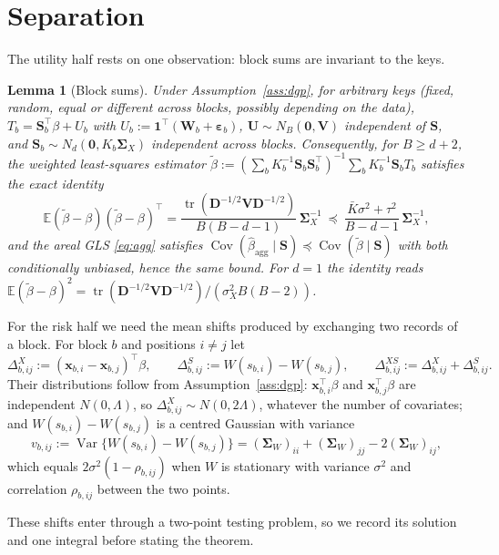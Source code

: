 \documentclass[11pt]{article}
\newtheorem{lemma}{Lemma}
\theoremstyle{definition}
\newcommand{\bx}{\bm{x}}\newcommand{\bg}{\bm{g}}\newcommand{\bw}{\bm{w}}\newcommand{\bz}{\bm{z}}
\newcommand{\bW}{\mathbf{W}}
\newcommand{\bS}{\mathbf{S}}
\newcommand{\bU}{\mathbf{U}}
\newcommand{\bV}{\mathbf{V}}
\newcommand{\bD}{\mathbf{D}}
\newcommand{\bone}{\mathbf{1}}
\newcommand{\bzero}{\mathbf{0}}
\newcommand{\beps}{\boldsymbol{\varepsilon}}
\newcommand{\bSig}{\boldsymbol{\Sigma}}
\newcommand{\E}{\mathbb{E}}
\newcommand{\Var}{\operatorname{Var}}
\newcommand{\Cov}{\operatorname{Cov}}
\newcommand{\tr}{\operatorname{tr}}
\newcommand{\agg}{\mathrm{agg}}
\begin{document}
\section{Separation}\label{sec:sep}

The utility half rests on one observation: block sums are invariant to the keys.

\begin{lemma}[Block sums]\label{lem:sums}
Under Assumption~\ref{ass:dgp}, for arbitrary keys (fixed, random, equal or different across blocks, possibly depending on the data), $T_b=\bS_b^\top\beta+U_b$ with $U_b:=\bone^\top(\bW_b+\beps_b)$, $\bU\sim N_B(\bzero,\bV)$ independent of $\mathbf S$, and $\bS_b\sim N_d(\bzero,K_b\bSig_X)$ independent across blocks. Consequently, for $B\ge d+2$, the weighted least-squares estimator $\tilde\beta:=(\sum_bK_b^{-1}\bS_b\bS_b^\top)^{-1}\sum_bK_b^{-1}\bS_bT_b$ satisfies the exact identity
\begin{equation}\label{eq:mse}
\E(\tilde\beta-\beta)(\tilde\beta-\beta)^\top=\frac{\tr(\bD^{-1/2}\bV\bD^{-1/2})}{B(B-d-1)}\,\bSig_X^{-1}\ \preceq\ \frac{\bar K\sigma^2+\tau^2}{B-d-1}\,\bSig_X^{-1},
\end{equation}
and the areal GLS \eqref{eq:agg} satisfies $\Cov(\hat\beta_\agg\mid\mathbf S)\preceq\Cov(\tilde\beta\mid\mathbf S)$ with both conditionally unbiased, hence the same bound. For $d=1$ the identity reads $\E(\tilde\beta-\beta)^2=\tr(\bD^{-1/2}\bV\bD^{-1/2})/(\sigma_X^2B(B-2))$.
\end{lemma}

For the risk half we need the mean shifts produced by exchanging two records of a block. For block $b$ and positions $i\ne j$ let
\begin{equation}\label{eq:shifts}
\Delta^X_{b,ij}:=(\bx_{b,i}-\bx_{b,j})^\top\beta,\qquad \Delta^S_{b,ij}:=W(s_{b,i})-W(s_{b,j}),\qquad \Delta^{XS}_{b,ij}:=\Delta^X_{b,ij}+\Delta^S_{b,ij}.
\end{equation}
Their distributions follow from Assumption~\ref{ass:dgp}: $\bx_{b,i}^\top\beta$ and $\bx_{b,j}^\top\beta$ are independent $N(0,\Lambda)$, so $\Delta^X_{b,ij}\sim N(0,2\Lambda)$, whatever the number of covariates; and $W(s_{b,i})-W(s_{b,j})$ is a centred Gaussian with variance
\[
v_{b,ij}:=\Var\{W(s_{b,i})-W(s_{b,j})\}=(\bSig_W)_{ii}+(\bSig_W)_{jj}-2(\bSig_W)_{ij},
\]
which equals $2\sigma^2(1-\rho_{b,ij})$ when $W$ is stationary with variance $\sigma^2$ and correlation $\rho_{b,ij}$ between the two points.

These shifts enter through a two-point testing problem, so we record its solution and one integral before stating the theorem.
\end{document}
